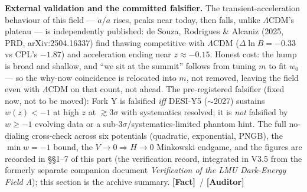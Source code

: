 \documentclass[11pt]{article}
\newcommand{\Fact}{\textbf{\textcolor{green!45!black}{[Fact]}}}
\newcommand{\Auditor}{\textbf{\textcolor{teal!55!black}{[Auditor]}}}
\begin{document}
\textbf{External validation and the committed falsifier.} The transient-acceleration behaviour of this field --- $\ddot a/a$ rises, peaks near today, then falls, unlike $\Lambda$CDM's plateau --- is independently published: de Souza, Rodrigues \& Alcaniz (2025, PRD, arXiv:2504.16337) find thawing competitive with $\Lambda$CDM ($\Delta\ln B=-0.33$ vs CPL's $-1.87$) and acceleration ending near $z\approx-0.15$. Honest cost: the hump is broad and shallow, and ``we sit at the summit'' follows from tuning $m$ to fit $w_0$ --- so the why-now coincidence is relocated into $m$, not removed, leaving the field even with $\Lambda$CDM on that count, not ahead. The pre-registered falsifier (fixed now, not to be moved): Fork Y is falsified \emph{iff} DESI-Y5 ($\sim$2027) sustains $w(z)<-1$ at high $z$ at $\gtrsim3\sigma$ with systematics resolved; it is \emph{not} falsified by $w\ge-1$ evolving data or a sub-3$\sigma$/systematics-limited phantom hint. The full no-dialing cross-check across six potentials (quadratic, exponential, PNGB), the $\min w=-1$ bound, the $V\to0\Rightarrow H\to0$ Minkowski endgame, and the figures are recorded in \S\S1--7 of this part (the verification record, integrated in V3.5 from the formerly separate companion document \emph{Verification of the LMU Dark-Energy Field A}); this section is the archive summary. \Fact\ / \Auditor
\end{document}
